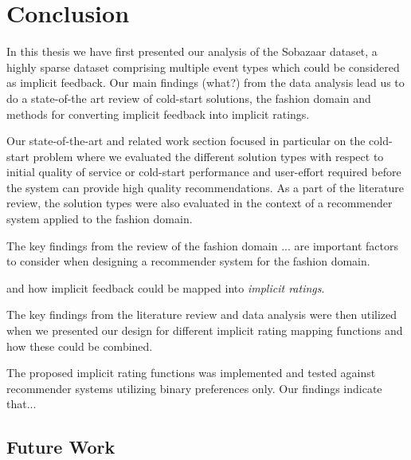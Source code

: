 
\chapter{Conclusion}

In this thesis we have first presented our analysis of the Sobazaar dataset, a highly sparse dataset comprising 
multiple event types which could be considered as implicit feedback. Our main findings (what?) from the data analysis
lead us to do a state-of-the art review of cold-start solutions, the fashion domain and methods for converting
implicit feedback into implicit ratings.

Our state-of-the-art and related work section focused in particular on the cold-start problem where we evaluated the 
different solution types with respect to initial quality of service or cold-start performance and user-effort required before the system can provide high quality recommendations.
As a part of the literature review, the solution types were also evaluated in the context of a recommender
system applied to the fashion domain.




The key findings from the review of the fashion domain ... are important factors to consider when designing a
recommender system for the fashion domain.


and how implicit feedback could be mapped into \emph{implicit ratings}.

The key findings from the literature review and data analysis were then utilized when we presented our
design for different implicit rating mapping functions and how these could be combined.


The proposed implicit rating functions was implemented and tested against recommender systems utilizing binary
preferences only. Our findings indicate that... 







\clearpage




\section{Future Work}





